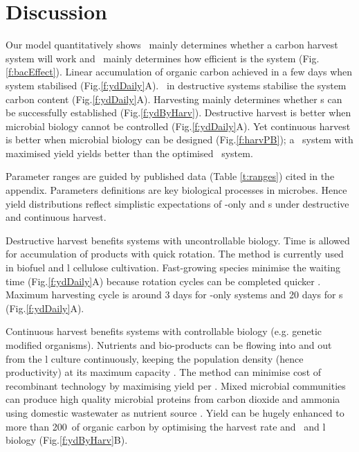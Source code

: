 \documentclass[../thesis.tex]{subfiles} %
\begin{document}
\section{Discussion}
Our model quantitatively shows \bac\ mainly determines whether a carbon harvest system will work and \phy\ mainly determines how efficient is the system (Fig.\ref{f:bacEffect}).  Linear accumulation of organic carbon achieved in a few days when system stabilised (Fig.\ref{f:ydDaily}A).  \Bac\ in destructive systems stabilise the system carbon content (Fig.\ref{f:ydDaily}A).  Harvesting mainly determines whether \pbs s can be successfully established (Fig.\ref{f:ydByHarv}).  Destructive harvest is better when microbial biology cannot be controlled (Fig.\ref{f:ydDaily}A).  Yet continuous harvest is better when microbial biology can be designed (Fig.\ref{f:harvPB}); a \PBH\ system with maximised yield yields better than the optimised \PBN\ system.

Parameter ranges are guided by published data (Table \ref{t:ranges}) cited in the appendix.  Parameters definitions are key biological processes in microbes.  Hence yield distributions reflect simplistic expectations of \phy-only and \pbs s under destructive and continuous harvest.

Destructive harvest benefits systems with uncontrollable biology.  Time is allowed for accumulation of products with quick rotation.  The method is currently used in biofuel \autocite{robertson2017cellulosic} and \bac l cellulose \autocite{aytekin2016statistical} cultivation.  Fast-growing species minimise the waiting time (Fig.\ref{f:ydDaily}A) because rotation cycles can be completed quicker \autocite{robertson2017cellulosic}.  Maximum harvesting cycle is around 3 days for \phy-only systems and 20 days for \pbs s (Fig.\ref{f:ydDaily}A).

Continuous harvest benefits systems with controllable biology (e.g. genetic modified organisms).  Nutrients and bio-products can be flowing into and out from the \bac l culture continuously, keeping the population density (hence productivity) at its maximum capacity \autocite{huang2012industrial,matassa2016autotrophic}.  The method can minimise cost of recombinant technology by maximising yield per \bac.  Mixed microbial communities can produce high quality microbial proteins from carbon dioxide and ammonia using domestic wastewater as nutrient source \autocite{matassa2016autotrophic}.  Yield can be hugely enhanced to more than 200\dxdt\ of organic carbon by optimising the harvest rate and \phy\ and \bac l biology (Fig.\ref{f:ydByHarv}B).
\end{document}
